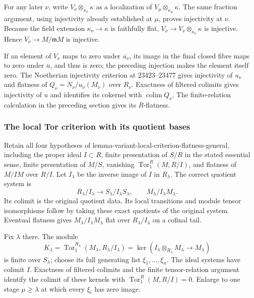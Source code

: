 For any later \(\nu\), write \(V_\nu\otimes_{\kappa_\nu}\kappa\) as a localization of \(V_\mu\otimes_{\kappa_\mu}\kappa\). The same fraction argument, using injectivity already established at \(\mu\), proves injectivity at \(\nu\). Because the field extension \(\kappa_\nu\to\kappa\) is faithfully flat, \(V_\nu\to V_\nu\otimes_{\kappa_\nu}\kappa\) is injective. Hence \(V_\nu\to M/\mathfrak mM\) is injective.

If an element of \(V_\nu\) maps to zero under \(\overline{u_\nu}\), its image in the final closed fibre maps to zero under \(\overline u\), and thus is zero; the preceding injection makes the element itself zero. The Noetherian injectivity criterion at 23423--23477 gives injectivity of \(u_\nu\) and flatness of \(Q_\nu=N_\nu/u_\nu(M_\nu)\) over \(R_\nu\). Exactness of filtered colimits gives injectivity of \(u\) and identifies its cokernel with \(\operatorname{colim}Q_\nu\). The finite-relation calculation in the preceding section gives its \(R\)-flatness.

\subsubsection{The local Tor criterion with its quotient bases}\label{algebra-proof-038-the-local-tor-criterion-with-its-quotient-bases}

Retain all four hypotheses of lemma-variant-local-criterion-flatness-general, including the proper ideal \(I\subset R\), finite presentation of \(S/R\) in the stated essential sense, finite presentation of \(M/S\), vanishing \(\operatorname{Tor}_1^R(M,R/I)\), and flatness of \(M/IM\) over \(R/I\). Let \(I_\lambda\) be the inverse image of \(I\) in \(R_\lambda\). The correct quotient system is \[
R_\lambda/I_\lambda\longrightarrow S_\lambda/I_\lambda S_\lambda,
\qquad M_\lambda/I_\lambda M_\lambda.
\] Its colimit is the original quotient data. Its local transitions and module tensor isomorphisms follow by taking these exact quotients of the original system. Eventual flatness gives \(M_\lambda/I_\lambda M_\lambda\) flat over \(R_\lambda/I_\lambda\) on a cofinal tail.

Fix \(\lambda\) there. The module \[
K_\lambda=\operatorname{Tor}_1^{R_\lambda}(M_\lambda,R_\lambda/I_\lambda)
 =\ker(I_\lambda\otimes_{R_\lambda}M_\lambda\to M_\lambda)
\] is finite over \(S_\lambda\); choose its full generating list \(\xi_1,\ldots,\xi_n\). The ideal systems have colimit \(I\). Exactness of filtered colimits and the finite tensor-relation argument identify the colimit of these kernels with \(\operatorname{Tor}_1^R(M,R/I)=0\). Enlarge to one stage \(\mu\geq\lambda\) at which every \(\xi_i\) has zero image.

